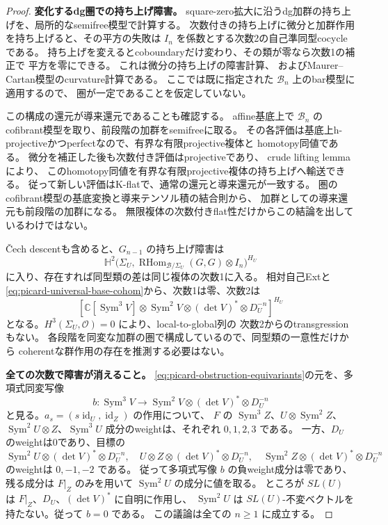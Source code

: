\documentclass[a4paper,11pt]{ltjsarticle}
\theoremstyle{definition}
\newcommand{\CC}{\mathbb C}
\newcommand{\OO}{\mathcal O}
\newcommand{\Sym}{\operatorname{Sym}}
\newcommand{\RHom}{\operatorname{RHom}}
\newcommand{\id}{\operatorname{id}}
\begin{document}
\begin{proof}
\textbf{変化するdg圏での持ち上げ障害。}
square-zero拡大に沿うdg加群の持ち上げを、局所的なsemifree模型で計算する。
次数付きの持ち上げに微分と加群作用を持ち上げると、その平方の失敗は
$I_n$ を係数とする次数2の自己準同型cocycleである。
持ち上げを変えるとcoboundaryだけ変わり、その類が零なら次数1の補正で
平方を零にできる。
これは微分の持ち上げの障害計算\cite[Theorem 3.8]{LowenObstruction}、
およびMaurer--Cartan模型\cite[Proposition 7.1]{ELOI}のcurvature計算である。
ここでは既に指定された $\mathcal B_n$ 上のbar模型に適用するので、
圏が一定であることを仮定していない。

この構成の還元が導来還元であることも確認する。
affine基底上で $\mathcal B_n$ のcofibrant模型を取り、前段階の加群をsemifreeに取る。
その各評価は基底上h-projectiveかつperfectなので、有界な有限projective複体と
homotopy同値である。
微分を補正した後も次数付き評価はprojectiveであり、
crude lifting lemma\cite[Corollary 3.11]{LowenObstruction}により、
このhomotopy同値を有界な有限projective複体の持ち上げへ輸送できる。
従って新しい評価はK-flatで、通常の還元と導来還元が一致する。
圏のcofibrant模型の基底変換と導来テンソル積の結合則から、
加群としての導来還元も前段階の加群になる。
無限複体の次数付きflat性だけからこの結論を出しているわけではない。

\v Cech descentも含めると、$G_{n-1}$ の持ち上げ障害は
\[
 \mathbb H^2\bigl(\Sigma_U,
       \RHom_{\mathcal B/\Sigma_U}(G,G)\otimes I_n\bigr)^{H_U}
\]
に入り、存在すれば同型類の差は同じ複体の次数1に入る。
相対自己Extと\eqref{eq:picard-universal-base-cohom}から、次数1は零、次数2は
\begin{equation}\label{eq:picard-obstruction-equivariants}
 \left[\CC[\Sym^3V]\otimes\Sym^2V\otimes(\det V)^*
                         \otimes D_U^{-n}\right]^{H_U}
\end{equation}
となる。$H^3(\Sigma_U,\OO)=0$ により、local-to-global列の
次数2からのtransgressionもない。
各段階を同変な加群の圏で構成しているので、同型類の一意性だけから
coherentな群作用の存在を推測する必要はない。

\textbf{全ての次数で障害が消えること。}
\eqref{eq:picard-obstruction-equivariants}の元を、多項式同変写像
\[
 b:\Sym^3V\longrightarrow
       \Sym^2V\otimes(\det V)^*\otimes D_U^{-n}
\]
と見る。$a_s=(s\id_U,\id_Z)$ の作用について、
$F$ の $\Sym^3Z$、$U\otimes\Sym^2Z$、$\Sym^2U\otimes Z$、$\Sym^3U$
成分のweightは、それぞれ $0,1,2,3$ である。
一方、$D_U$ のweightは0であり、目標の
\[
 \Sym^2U\otimes(\det V)^*\otimes D_U^{-n},\quad
 U\otimes Z\otimes(\det V)^*\otimes D_U^{-n},\quad
 \Sym^2Z\otimes(\det V)^*\otimes D_U^{-n}
\]
のweightは $0,-1,-2$ である。
従って多項式写像 $b$ の負weight成分は零であり、残る成分は
$F|_Z$ のみを用いて $\Sym^2U$ の成分に値を取る。
ところが $SL(U)$ は $F|_Z$、$D_U$、$(\det V)^*$ に自明に作用し、
$\Sym^2U$ は $SL(U)$-不変ベクトルを持たない。従って $b=0$ である。
この議論は全ての $n\ge1$ に成立する。


\end{proof}
\end{document}
